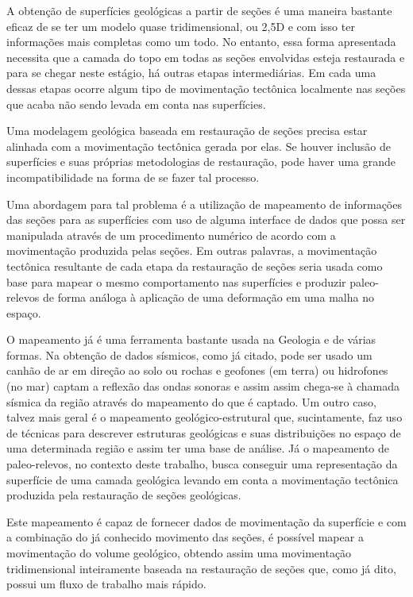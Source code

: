 A obtenção de superfícies geológicas a partir de seções é uma maneira bastante eficaz de se ter um modelo quase tridimensional, ou 2,5D e com isso ter informações mais completas como um todo. No entanto, essa forma apresentada necessita que a camada do topo em todas as seções envolvidas esteja restaurada e para se chegar neste estágio, há outras etapas intermediárias. Em cada uma dessas etapas ocorre algum tipo de movimentação tectônica localmente nas seções que acaba não sendo levada em conta nas superfícies.

Uma modelagem geológica baseada em restauração de seções precisa estar alinhada com a movimentação tectônica gerada por elas. Se houver inclusão de superfícies e suas próprias metodologias de restauração, pode haver uma grande incompatibilidade na forma de se fazer tal processo.

Uma abordagem para tal problema é a utilização de mapeamento de informações das seções para as superfícies com uso de alguma interface de dados que possa ser manipulada através de um procedimento numérico de acordo com a movimentação produzida pelas seções. Em outras palavras, a movimentação tectônica resultante de cada etapa da restauração de seções seria usada como base para mapear o mesmo comportamento nas superfícies e produzir paleo-relevos de forma análoga à aplicação de uma deformação em uma malha no espaço.

O mapeamento já é uma ferramenta bastante usada na Geologia e de várias formas. Na obtenção de dados sísmicos, como já citado, pode ser usado um canhão de ar em direção ao solo ou rochas e geofones (em terra) ou hidrofones (no mar) captam a reflexão das ondas sonoras e assim assim chega-se à chamada sísmica da região através do mapeamento do que é captado.\cite{Fossen} Um outro caso, talvez mais geral é o mapeamento geológico-estrutural que, sucintamente, faz uso de técnicas para descrever estruturas geológicas e suas distribuições no espaço de uma determinada região e assim ter uma base de análise.\cite{Borges, Felipe} Já o mapeamento de paleo-relevos, no contexto deste trabalho, busca conseguir uma representação da superfície de uma camada geológica levando em conta a movimentação tectônica produzida pela restauração de seções geológicas.

Este mapeamento é capaz de fornecer dados de movimentação da superfície e com a combinação do já conhecido movimento das seções, é possível mapear a movimentação do volume geológico, obtendo assim uma movimentação tridimensional inteiramente baseada na restauração de seções que, como já dito, possui um fluxo de trabalho mais rápido.

